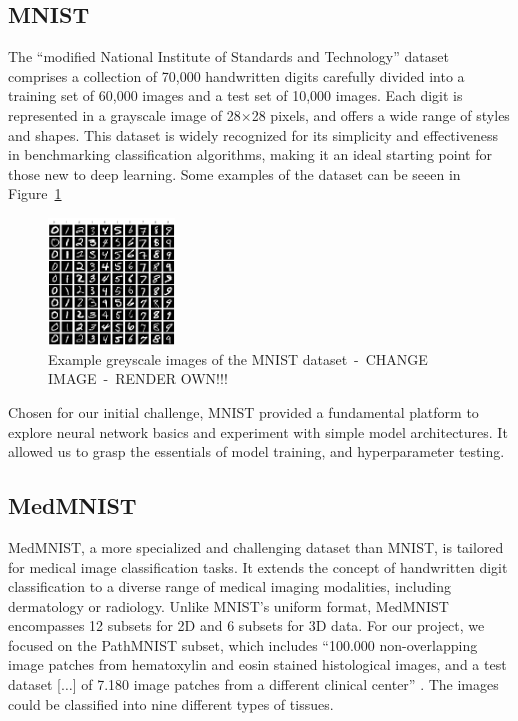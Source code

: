 \subsection{MNIST}\label{mnist}
The ``modified National Institute of Standards and Technology'' dataset comprises a collection of 70,000 handwritten digits carefully divided into a training set of 60,000 images and a test set of 10,000 images. Each digit is represented in a grayscale image of 28$\times$28 pixels, and offers a wide range of styles and shapes. This dataset is widely recognized for its simplicity and effectiveness in benchmarking classification algorithms, making it an ideal starting point for those new to deep learning. Some examples of the dataset can be seeen in Figure~\ref{fig:MNIST}

\begin{figure}
    \centering
    \includegraphics[width=0.3\textwidth]{figures/MNIST.png}
    \caption{Example greyscale images of the MNIST dataset~-~CHANGE IMAGE~-~RENDER OWN!!!}\label{fig:MNIST}
\end{figure}

Chosen for our initial challenge, MNIST provided a fundamental platform to explore neural network basics and experiment with simple model architectures. It allowed us to grasp the essentials of model training, and hyperparameter testing.


\subsection{MedMNIST}\label{medmnist}

MedMNIST, a more specialized and challenging dataset than MNIST, is tailored for medical image classification tasks. It extends the concept of handwritten digit classification to a diverse range of medical imaging modalities, including dermatology or radiology. Unlike MNIST's uniform format, MedMNIST encompasses 12 subsets for 2D and 6 subsets for 3D data. For our project, we focused on the PathMNIST \citep{kather2018, kather2019} subset, which includes ``100.000 non-overlapping image patches from hematoxylin and eosin stained histological images, and a test dataset [$\ldots$] of 7.180 image patches from a different clinical center'' \citep{medmnistv1}. The images could be classified into nine different types of tissues.

